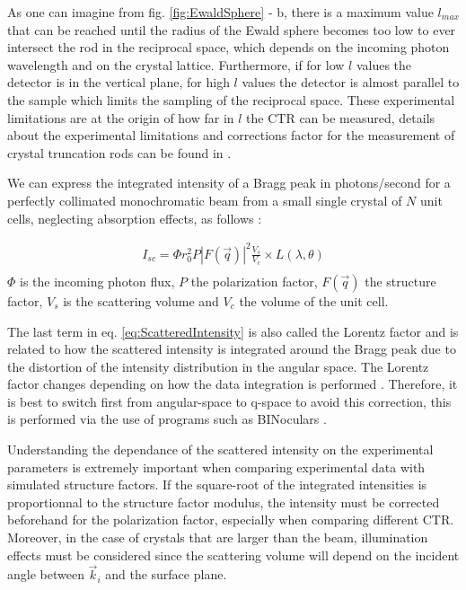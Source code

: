 As one can imagine from fig. \ref{fig:EwaldSphere} - b, there is a maximum value $l_{max}$ that can be reached until the radius of the Ewald sphere becomes too low to ever intersect the rod in the reciprocal space, which depends on the incoming photon wavelength and on the crystal lattice.
Furthermore, if for low $l$ values the detector is in the vertical plane, for high $l$ values the detector is almost parallel to the sample which limits the sampling of the reciprocal space.
These experimental limitations are at the origin of how far in $l$ the CTR can be measured, details about the experimental limitations and corrections factor for the measurement of crystal truncation rods can be found in \cite{Vlieg1997, Drnec2014}.

We can express the integrated intensity of a Bragg peak in photons/second for a perfectly collimated monochromatic beam from a small single crystal of $N$ unit cells, neglecting absorption effects, as follows \parencite{NielsenMcMorrow}:

\begin{gather}
    \label{eq:ScatteredIntensity}
    I_{sc} = \Phi r_0^2 P |F(\vec{q})|^2 \frac{V_s}{V_c} \times L(\lambda, \theta)\\
\end{gather}
$\Phi$ is the incoming photon flux, $P$ the polarization factor, $F(\vec{q})$ the structure factor, $V_s$ is the scattering volume and $V_c$ the volume of the unit cell.

The last term in eq. \ref{eq:ScatteredIntensity} is also called the Lorentz factor and is related to how the scattered intensity is integrated around the Bragg peak due to the distortion of the intensity distribution in the angular space.
The Lorentz factor changes depending on how the data integration is performed \parencite{Robach2000, Drnec2014}.
Therefore, it is best to switch first from angular-space to q-space to avoid this correction, this is performed via the use of programs such as BINoculars \parencite{Roobol2015}.

Understanding the dependance of the scattered intensity on the experimental parameters is extremely important when comparing experimental data with simulated structure factors.
If the square-root of the integrated intensities is proportionnal to the structure factor modulus, the intensity must be corrected beforehand for the polarization factor, especially when comparing different CTR.
Moreover, in the case of crystals that are larger than the beam, illumination effects must be considered since the scattering volume will depend on the incident angle between $\vec{k}_i$ and the surface plane.

